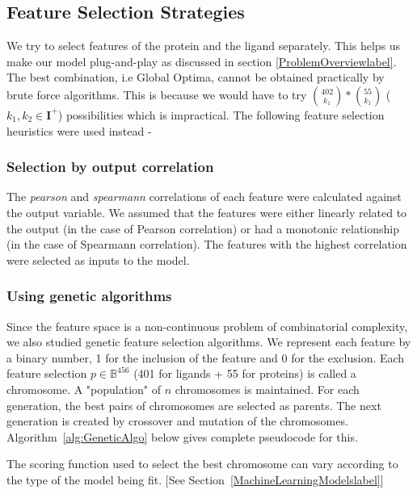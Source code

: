 \documentclass[11pt]{article}
\begin{document}
\subsection{Feature Selection Strategies}


We try to select features of the protein and the ligand separately.
This helps us make our model plug-and-play as discussed in section \ref{ProblemOverviewlabel}.
The best combination,  i.e Global Optima,  cannot be obtained practically by brute force algorithms.
This is because we would have to try $\binom{402}{k_1} * \binom{55}{k_1}$ ($k_1, k_2 \in \mathbf{I}^+$) possibilities which is impractical.
The following feature selection heuristics were used instead -

\subsubsection{Selection by output correlation}
The \textit{pearson} and \textit{spearmann} correlations of each feature were calculated against the output variable.
We assumed that the features were either linearly related to the output (in the case of Pearson correlation) or had a monotonic relationship (in the case of Spearmann correlation).
The features with the highest correlation were selected as inputs to the model.

\subsubsection{Using genetic algorithms \cite{genetic_algorithm}}
Since the feature space is a non-continuous problem of combinatorial complexity,
we also studied genetic feature selection algorithms.
We represent each feature by a binary number, 1 for the inclusion of the feature and 0 for the exclusion.
Each feature selection $p \in \mathbb{B}^{456}$ (401 for ligands + 55 for proteins) is called a chromosome.
A "population" of $n$ chromosomes is maintained.
For each generation,  the best pairs of chromosomes are selected as parents.
The next generation is created by crossover and mutation of the chromosomes.
Algorithm~\ref{alg:GeneticAlgo} below gives complete pseudocode for this.

The scoring function used to select the best chromosome can vary according to the type of the model being fit. [See Section~\ref{MachineLearningModelslabel}]
\end{document}
